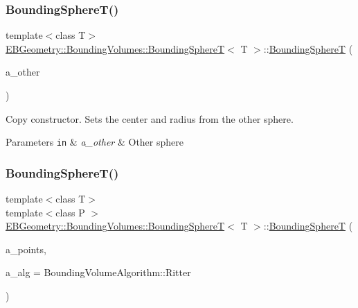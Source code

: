 \subsubsection{\texorpdfstring{Bounding\+Sphere\+T()}{BoundingSphereT()}\hspace{0.1cm}{\footnotesize\ttfamily [3/4]}}
{\footnotesize\ttfamily template$<$class T$>$ \\
\hyperlink{classEBGeometry_1_1BoundingVolumes_1_1BoundingSphereT}{E\+B\+Geometry\+::\+Bounding\+Volumes\+::\+Bounding\+SphereT}$<$ T $>$\+::\hyperlink{classEBGeometry_1_1BoundingVolumes_1_1BoundingSphereT}{Bounding\+SphereT} (\begin{DoxyParamCaption}\item[{const \hyperlink{classEBGeometry_1_1BoundingVolumes_1_1BoundingSphereT}{Bounding\+SphereT}$<$ T $>$ \&}]{a\+\_\+other }\end{DoxyParamCaption})}



Copy constructor. Sets the center and radius from the other sphere. 


\begin{DoxyParams}[1]{Parameters}
\mbox{\tt in}  & {\em a\+\_\+other} & Other sphere \\
\hline
\end{DoxyParams}
\mbox{\label{classEBGeometry_1_1BoundingVolumes_1_1BoundingSphereT_ad780b67034525d145508a13f8b324546}} 
\subsubsection{\texorpdfstring{Bounding\+Sphere\+T()}{BoundingSphereT()}\hspace{0.1cm}{\footnotesize\ttfamily [4/4]}}
{\footnotesize\ttfamily template$<$class T$>$ \\
template$<$class P $>$ \\
\hyperlink{classEBGeometry_1_1BoundingVolumes_1_1BoundingSphereT}{E\+B\+Geometry\+::\+Bounding\+Volumes\+::\+Bounding\+SphereT}$<$ T $>$\+::\hyperlink{classEBGeometry_1_1BoundingVolumes_1_1BoundingSphereT}{Bounding\+SphereT} (\begin{DoxyParamCaption}\item[{const std\+::vector$<$ \hyperlink{classVec3T}{Vec3T}$<$ P $>$ $>$ \&}]{a\+\_\+points,  }\item[{const \hyperlink{classEBGeometry_1_1BoundingVolumes_1_1BoundingSphereT_ae80a2de96c8230589e4ea05fa9943946}{Bounding\+Volume\+Algorithm} \&}]{a\+\_\+alg = {\ttfamily BoundingVolumeAlgorithm\+:\+:Ritter} }\end{DoxyParamCaption})}



